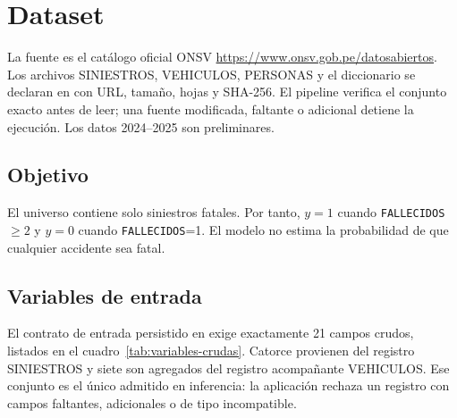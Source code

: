 \section{Dataset}\label{sec:dataset}

La fuente es el catálogo oficial ONSV \url{https://www.onsv.gob.pe/datosabiertos}. Los archivos SINIESTROS, VEHICULOS, PERSONAS y el diccionario se declaran en  con URL, tamaño, hojas y SHA-256. El pipeline verifica el conjunto exacto antes de leer; una fuente modificada, faltante o adicional detiene la ejecución. Los datos 2024--2025 son preliminares.

\subsection{Objetivo}
El universo contiene solo siniestros fatales. Por tanto, $y=1$ cuando \texttt{FALLECIDOS}$\geq2$ y $y=0$ cuando \texttt{FALLECIDOS}=1. El modelo no estima la probabilidad de que cualquier accidente sea fatal.

\subsection{Variables de entrada}
El contrato de entrada persistido en  exige exactamente 21 campos crudos, listados en el cuadro~\ref{tab:variables-crudas}. Catorce provienen del registro SINIESTROS y siete son agregados del registro acompañante VEHICULOS. Ese conjunto es el único admitido en inferencia: la aplicación rechaza un registro con campos faltantes, adicionales o de tipo incompatible.

